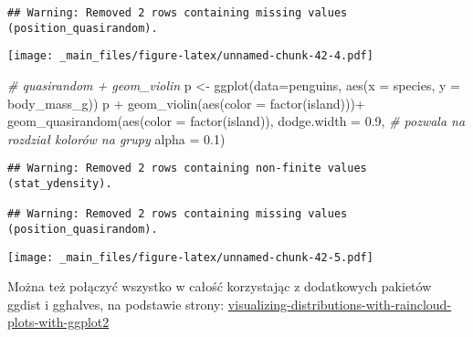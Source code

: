 \documentclass[
]{book}
\newenvironment{Shaded}{\begin{snugshade}}{\end{snugshade}}
\newcommand{\AttributeTok}[1]{\textcolor[rgb]{0.77,0.63,0.00}{#1}}
\newcommand{\CommentTok}[1]{\textcolor[rgb]{0.56,0.35,0.01}{\textit{#1}}}
\newcommand{\FloatTok}[1]{\textcolor[rgb]{0.00,0.00,0.81}{#1}}
\newcommand{\FunctionTok}[1]{\textcolor[rgb]{0.00,0.00,0.00}{#1}}
\newcommand{\NormalTok}[1]{#1}
\newcommand{\OtherTok}[1]{\textcolor[rgb]{0.56,0.35,0.01}{#1}}
\newcommand{\SpecialCharTok}[1]{\textcolor[rgb]{0.00,0.00,0.00}{#1}}
\begin{document}
\begin{verbatim}
## Warning: Removed 2 rows containing missing values (position_quasirandom).
\end{verbatim}

\texttt{[image: \_main\_files/figure-latex/unnamed-chunk-42-4.pdf]}

\begin{Shaded}
\begin{Highlighting}[]
\CommentTok{\# quasirandom + geom\_violin}
\NormalTok{p }\OtherTok{\textless{}{-}} \FunctionTok{ggplot}\NormalTok{(}\AttributeTok{data=}\NormalTok{penguins, }\FunctionTok{aes}\NormalTok{(}\AttributeTok{x =}\NormalTok{ species, }\AttributeTok{y =}\NormalTok{ body\_mass\_g))}
\NormalTok{p }\SpecialCharTok{+} \FunctionTok{geom\_violin}\NormalTok{(}\FunctionTok{aes}\NormalTok{(}\AttributeTok{color =} \FunctionTok{factor}\NormalTok{(island)))}\SpecialCharTok{+}
  \FunctionTok{geom\_quasirandom}\NormalTok{(}\FunctionTok{aes}\NormalTok{(}\AttributeTok{color =} \FunctionTok{factor}\NormalTok{(island)), }
                   \AttributeTok{dodge.width =} \FloatTok{0.9}\NormalTok{, }\CommentTok{\# pozwala na rozdział kolorów na grupy}
                   \AttributeTok{alpha =} \FloatTok{0.1}\NormalTok{)}
\end{Highlighting}
\end{Shaded}

\begin{verbatim}
## Warning: Removed 2 rows containing non-finite values (stat_ydensity).

## Warning: Removed 2 rows containing missing values (position_quasirandom).
\end{verbatim}

\texttt{[image: \_main\_files/figure-latex/unnamed-chunk-42-5.pdf]}

Można też połączyć wszystko w całość korzystając z dodatkowych pakietów ggdist i gghalves, na podstawie strony: \href{https://www.cedricscherer.com/2021/06/06/visualizing-distributions-with-raincloud-plots-with-ggplot2/}{visualizing-distributions-with-raincloud-plots-with-ggplot2}
\end{document}

